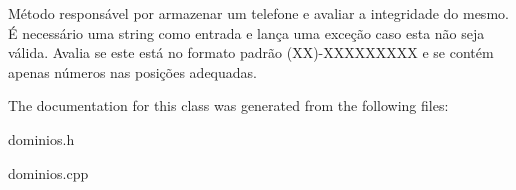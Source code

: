 Método responsável por armazenar um telefone e avaliar a integridade do mesmo. É necessário uma string como entrada e lança uma exceção caso esta não seja válida. Avalia se este está no formato padrão (XX)-\/\+X\+X\+X\+X\+X\+X\+X\+XX e se contém apenas números nas posições adequadas. 

The documentation for this class was generated from the following files\+:\begin{DoxyCompactItemize}
\item 
dominios.\+h\item 
dominios.\+cpp\end{DoxyCompactItemize}
